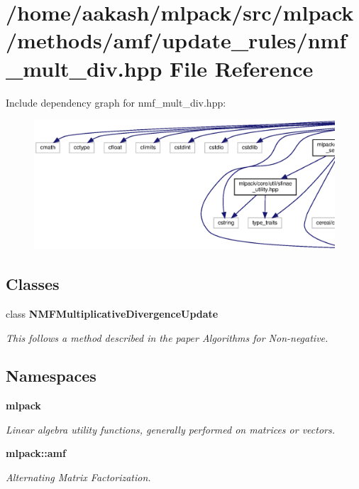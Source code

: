 \section{/home/aakash/mlpack/src/mlpack/methods/amf/update\+\_\+rules/nmf\+\_\+mult\+\_\+div.hpp File Reference}
\label{nmf__mult__div_8hpp}
Include dependency graph for nmf\+\_\+mult\+\_\+div.\+hpp\+:
\nopagebreak
\begin{figure}[H]
\begin{center}
\leavevmode
\includegraphics[width=350pt]{nmf__mult__div_8hpp__incl}
\end{center}
\end{figure}
\subsection*{Classes}
\begin{DoxyCompactItemize}
\item 
class \textbf{ N\+M\+F\+Multiplicative\+Divergence\+Update}
\begin{DoxyCompactList}\small\item\em This follows a method described in the paper \textquotesingle{}Algorithms for Non-\/negative. \end{DoxyCompactList}\end{DoxyCompactItemize}
\subsection*{Namespaces}
\begin{DoxyCompactItemize}
\item 
 \textbf{ mlpack}
\begin{DoxyCompactList}\small\item\em Linear algebra utility functions, generally performed on matrices or vectors. \end{DoxyCompactList}\item 
 \textbf{ mlpack\+::amf}
\begin{DoxyCompactList}\small\item\em Alternating Matrix Factorization. \end{DoxyCompactList}\end{DoxyCompactItemize}


